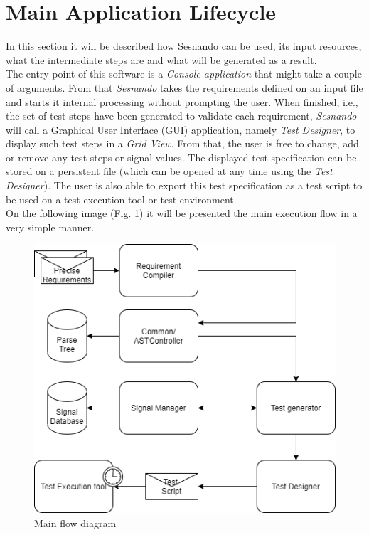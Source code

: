 \section{Main Application Lifecycle}
\label{sec:application_lifecycle}

In this section it will be described how Sesnando can be used, its input resources, what the intermediate steps are and what will be generated as a result.\\
The entry point of this software is a \textit{Console application} that might take a couple of arguments. From that \textit{Sesnando} takes the requirements defined on an input file and starts it internal processing without prompting the user. When finished, i.e., the set of test steps have been generated to validate each requirement, \textit{Sesnando} will call a Graphical User Interface (GUI) application, namely \textit{Test Designer}, to display such test steps in a \textit{Grid View}. From that, the user is free to change, add or remove any test steps or signal values. The displayed test specification can be stored on a persistent file (which can be opened at any time using the \textit{Test Designer}). The user is also able to export this test specification as a test script to be used on a test execution tool or test environment.\\

On the following image (Fig. \ref{fig:data_flow}) it will be presented the main execution flow in a very simple manner. \\
\begin{figure}[H]
    \centering
    \includegraphics[scale=0.625]{images/sesnando_dataflow.drawio.png}
    \caption{Main flow diagram}
    \label{fig:data_flow}
\end{figure}

